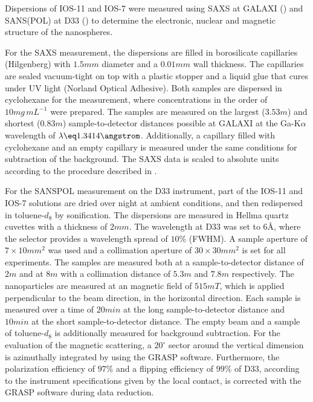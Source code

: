 \documentclass[\main/dresen_thesis.tex]{subfiles}
\begin{document}

    Dispersions of IOS-11 and IOS-7 were measured using SAXS at GALAXI () and SANS(POL) at D33 () to determine the electronic, nuclear and magnetic structure of the nanospheres.

    For the SAXS measurement, the dispersions are filled in borosilicate capillaries (Hilgenberg) with $1.5 \unit{mm}$ diameter and a $0.01 \unit{mm}$ wall thickness.
    The capillaries are sealed vacuum-tight on top with a plastic stopper and a liquid glue that cures under UV light (Norland Optical Adhesive).
    Both samples are dispersed in cyclohexane for the measurement, where concentrations in the order of $10 \unit{mg \, mL^{-1}}$ were prepared.
    The samples are measured on the largest ($3.53 \unit{m}$) and shortest ($0.83 \unit{m}$) sample-to-detector distances possible at GALAXI at the Ga-K$\alpha$ wavelength of $\lambda \eq 1.3414 \angstrom$.
    Additionally, a capillary filled with cyclohexane and an empty capillary is measured under the same conditions for subtraction of the background.
    The SAXS data is scaled to absolute units according to the procedure described in .

    For the SANSPOL measurement on the D33 instrument, part of the IOS-11 and IOS-7 solutions are dried over night at ambient conditions, and then redispersed in toluene-$\mathit{d_8}$ by sonification.
    The dispersions are measured in Hellma quartz cuvettes with a thickness of $2 \unit{mm}$.
    The wavelength at D33 was set to $6 \unit{\angstrom}$, where the selector provides a wavelength spread of $10 \%$ (FWHM).
    A sample aperture  of $7 \times 10 \unit{mm^2}$ was used and a collimation aperture of $30 \times 30 \unit{mm^2}$ is set for all experiments.
    The samples are measured both at a sample-to-detector distance of $2 \unit{m}$ and at $8 \unit{m}$ with a collimation distance of $5.3 \unit{m}$ and $7.8 \unit{m}$ respectively.
    The nanoparticles are measured at an magnetic field of $515 \unit{mT}$, which is applied perpendicular to the beam direction, in the horizontal direction.
    Each sample is measured over a time of $20 \unit{min}$ at the long sample-to-detector distance and $10 \unit{min}$ at the short sample-to-detector distance.
    The empty beam and a sample of toluene-$\mathit{d_8}$ is additionally measured for background subtraction.
    For the evaluation of the magnetic scattering, a $20^\circ$ sector around the vertical dimension is azimuthally integrated by using the GRASP software.
    Furthermore, the polarization efficiency of $97 \%$ and a flipping efficiency of $99 \%$ of D33, according to the instrument specifications given by the local contact, is corrected with the GRASP software during data reduction.
\end{document}
